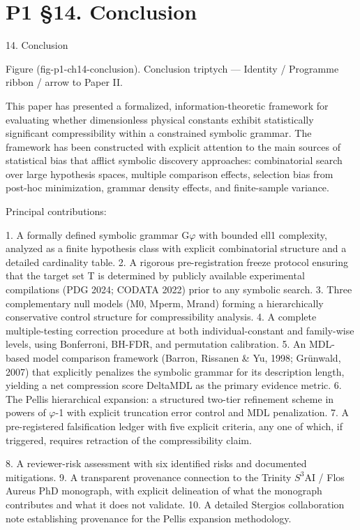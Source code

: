 
\section{P1 §14. Conclusion}

14. Conclusion

     Figure (fig-p1-ch14-conclusion). Conclusion triptych --- Identity / Programme ribbon / arrow to
                                               Paper II.

  This paper has presented a formalized, information-theoretic framework for evaluating
  whether     dimensionless     physical   constants exhibit    statistically significant
  compressibility within a constrained symbolic grammar. The framework has been
  constructed with explicit attention to the main sources of statistical bias that afflict
  symbolic discovery approaches: combinatorial search over large hypothesis spaces,
  multiple comparison effects, selection bias from post-hoc minimization, grammar
  density effects, and finite-sample variance.

  Principal contributions:

  1. A formally defined symbolic grammar G$\varphi$ with bounded ell1 complexity, analyzed as
  a finite hypothesis class with explicit combinatorial structure and a detailed cardinality
  table.
  2. A rigorous pre-registration freeze protocol ensuring that the target set T is
  determined by publicly available experimental compilations (PDG 2024; CODATA 2022)
  prior to any symbolic search.
  3. Three complementary null models (M0, Mperm, Mrand) forming a hierarchically
  conservative control structure for compressibility analysis.
  4. A complete multiple-testing correction procedure at both individual-constant and
  family-wise levels, using Bonferroni, BH-FDR, and permutation calibration.
  5. An MDL-based model comparison framework (Barron, Rissanen \& Yu, 1998;
  Grünwald, 2007) that explicitly penalizes the symbolic grammar for its description
  length, yielding a net compression score DeltaMDL as the primary evidence metric.
  6. The Pellis hierarchical expansion: a structured two-tier refinement scheme in powers
  of $\varphi$-1 with explicit truncation error control and MDL penalization.
  7. A pre-registered falsification ledger with five explicit criteria, any one of which, if
  triggered, requires retraction of the compressibility claim.

  8. A reviewer-risk assessment with six identified risks and documented mitigations.
  9. A transparent provenance connection to the Trinity $S^{3}$AI / Flos Aureus PhD
  monograph, with explicit delineation of what the monograph contributes and what it
  does not validate.
  10. A detailed Stergios collaboration note establishing provenance for the Pellis
  expansion methodology.

